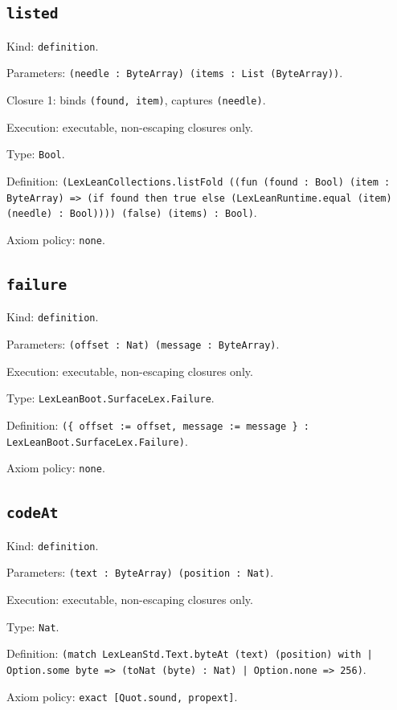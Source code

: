 \documentclass[11pt]{article}
\begin{document}
\subsection*{\texttt{listed}}
\noindent Kind: \texttt{definition}.\par
\noindent Parameters: \texttt{(needle : ByteArray) (items : List (ByteArray))}.\par
\noindent Closure 1: binds \texttt{(found, item)}, captures \texttt{(needle)}.\par
\noindent Execution: executable, non-escaping closures only.\par
\noindent Type: \texttt{Bool}.\par
\noindent Definition: \texttt{(LexLeanCollections.listFold ((fun (found : Bool) (item : ByteArray) => (if found then true else (LexLeanRuntime.equal (item) (needle) : Bool)))) (false) (items) : Bool)}.\par
\noindent Axiom policy: \texttt{none}.\par
\subsection*{\texttt{failure}}
\noindent Kind: \texttt{definition}.\par
\noindent Parameters: \texttt{(offset : Nat) (message : ByteArray)}.\par
\noindent Execution: executable, non-escaping closures only.\par
\noindent Type: \texttt{LexLeanBoot.SurfaceLex.Failure}.\par
\noindent Definition: \texttt{(\{ offset := offset, message := message \} : LexLeanBoot.SurfaceLex.Failure)}.\par
\noindent Axiom policy: \texttt{none}.\par
\subsection*{\texttt{codeAt}}
\noindent Kind: \texttt{definition}.\par
\noindent Parameters: \texttt{(text : ByteArray) (position : Nat)}.\par
\noindent Execution: executable, non-escaping closures only.\par
\noindent Type: \texttt{Nat}.\par
\noindent Definition: \texttt{(match LexLeanStd.Text.byteAt (text) (position) with | Option.some byte => (toNat (byte) : Nat) | Option.none => 256)}.\par
\noindent Axiom policy: \texttt{exact [Quot.sound, propext]}.\par
\end{document}
